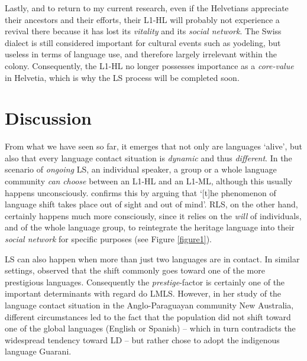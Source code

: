 \documentclass[output=paper,
modfonts
]{langscibook}
\begin{document}
Lastly, and to return to my current research, even if the Helvetians appreciate their ancestors and their efforts, their L1-HL will probably not experience a revival there because it has lost its \emph{vitality} and its \emph{social network}. The Swiss dialect is  still considered important for cultural events such as yodeling, but useless in terms of language use, and therefore largely irrelevant within the colony. Consequently, the L1-HL no longer possesses importance as a \emph{core-value} in Helvetia, which is why the LS process will be completed soon.

\section{Discussion}
\label{discussion}

From what we have seen so far, it emerges that not only are languages ‘alive', but also that every language contact situation is \emph{dynamic} and thus \emph{different}. In the scenario of \emph{ongoing} LS, an individual speaker, a group or a whole language community \emph{can} \emph{choose} between an L1-HL and an L1-ML, although this usually happens unconsciously.  \cite[para. 8]{Buda1992} confirms this by arguing that ‘{[}t{]}he phenomenon of language shift takes place out of sight and out of mind’. RLS, on the other hand, certainly happens much more consciously, since it relies on the \emph{will} of  individuals, and of the whole language group, to reintegrate the heritage language into their \emph{social network} for specific purposes (see Figure \ref{figure1}).

LS can also happen when more than just two languages are in contact. In similar settings, \cite{Perez2016} observed that the shift commonly goes toward one of the more prestigious languages. Consequently the \emph{prestige}-factor is certainly one of the important determinants with regard do LMLS. However, in her study of the language contact situation in the Anglo-Paraguayan community New Australia, different circumstances led to the fact that the population did not shift toward one of the global languages (English or Spanish) -- which in turn contradicts the widespread tendency toward LD -- but rather chose to adopt the indigenous language Guarani. 
\end{document}
